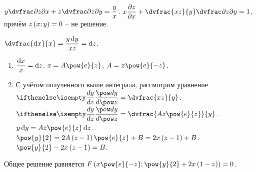 \documentclass[a5paper,10pt]{article}
\begin{document}
    
    $y \vparder{z} {x} + z \vparder{z} {y} = \dfrac {y} {x}$.
    $x \parder{z} {x} + \dvfrac {xz} {y} \vparder{z} {y} = 1$,
    причём $z\left(\hspace{0.01em}x; y\hspace{0.01em}\right) = 0$ -- не решение.

    $\dvfrac {\di x} {x} = \dfrac {y \di y} {xz} = {\di z}$.
    
    \begin{enumerate}
        \item $\dfrac {\di x} {x} = \di z$.
        $x = A\pow{e}{z}$;
        $A = x \pow {e}{-z}$.
        
        \item С учётом полученного выше интеграла, рассмотрим уравнение
        $\der{y}{z} = \dvfrac {xz} {y}$. \\
        $\der{y}{z} = \dvfrac {Az \pow{e}{z}} {y}$.
        $y \di y = Az \pow {e} {z} \di z$.
        $\pow{y}{2} = 2A \br{z - 1} \pow {e} {z} + B = 2x\br{z - 1} + B$.
        $\pow{y}{2} - 2x\br{z - 1} = B$.
    \end{enumerate}
    
    Общее решение равняется $F\br{x \pow{e} {-z}; \pow{y}{2} + 2x \br{1 - z}} = 0$.
\end{document}
